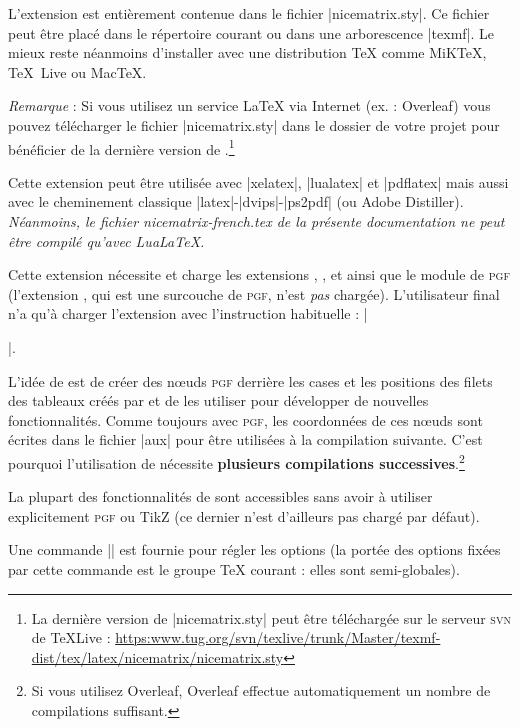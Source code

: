 \documentclass[dvipsnames]{article}%
\begin{document}
\vspace{1cm}

L'extension  est entièrement contenue dans le fichier |nicematrix.sty|. Ce fichier peut être placé
dans le répertoire courant ou dans une arborescence |texmf|. Le mieux reste néanmoins d'installer 
avec une distribution TeX comme MiKTeX, TeX~Live ou MacTeX.

\medskip
\emph{Remarque} : Si vous utilisez un service LaTeX via Internet (ex. :
Overleaf) vous pouvez télécharger le fichier |nicematrix.sty| dans le dossier de
votre projet pour bénéficier de la dernière version de
.\footnote{La dernière version de |nicematrix.sty| peut
  être téléchargée sur le serveur \textsc{svn} de TeXLive : \newline \small
  \url{https:www.tug.org/svn/texlive/trunk/Master/texmf-dist/tex/latex/nicematrix/nicematrix.sty}}

\medskip
Cette extension peut être utilisée avec |xelatex|, |lualatex| et |pdflatex| mais
aussi avec le cheminement classique |latex|-|dvips|-|ps2pdf| (ou Adobe
Distiller). \textsl{Néanmoins, le fichier nicematrix-french.tex de la présente
  documentation ne peut être compilé qu'avec LuaLaTeX.}

\medskip
Cette extension nécessite et charge les extensions , ,
 et  ainsi que le module  de \textsc{pgf}
(l'extension , qui est une surcouche de \textsc{pgf}, n'est \emph{pas}
chargée). L'utilisateur final n'a qu'à charger l'extension  avec
l'instruction habituelle : |\usepackage{nicematrix}|.


\medskip
L'idée de  est de créer des nœuds \textsc{pgf} derrière les
cases et les positions des filets des tableaux créés par  et de les
utiliser pour développer de nouvelles fonctionnalités. Comme toujours avec
\textsc{pgf}, les coordonnées de ces nœuds sont écrites dans le fichier |aux|
pour être utilisées à la compilation suivante. C'est pourquoi l'utilisation de
 nécessite \textbf{plusieurs compilations
  successives}.\footnote{Si vous utilisez Overleaf, Overleaf effectue
  automatiquement un nombre de compilations suffisant.}

\medskip
La plupart des fonctionnalités de  sont accessibles sans avoir à
utiliser explicitement \textsc{pgf} ou TikZ (ce dernier n'est d'ailleurs pas
chargé par défaut).

\medskip
{}
Une commande |\NiceMatrixOptions| est fournie pour régler les options (la portée
des options fixées par cette commande est le groupe TeX courant : elles sont
semi-globales).
\end{document}
